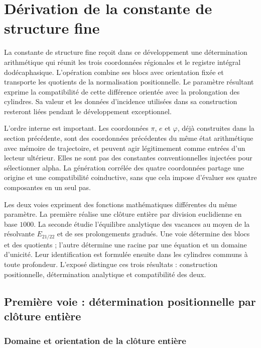 \section{Dérivation de la constante de structure fine}
\label{x_reciprocidad:sec:alpha}

La constante de structure fine reçoit dans ce développement une détermination arithmétique qui réunit les trois coordonnées régionales et le registre intégral dodécaphasique. L'opération combine ses blocs avec orientation fixée et transporte les quotients de la normalisation positionnelle. Le paramètre résultant exprime la compatibilité de cette différence orientée avec la prolongation des cylindres. Sa valeur et les données d'incidence utilisées dans sa construction resteront liées pendant le développement exceptionnel.

L'ordre interne est important. Les coordonnées \(\pi\), \(e\) et \(\varphi\), déjà construites dans la section précédente, sont des coordonnées
précédentes du même état arithmétique avec mémoire de trajectoire, et peuvent agir légitimement comme
entrées d'un lecteur ultérieur. Elles ne sont pas des constantes conventionnelles
injectées pour sélectionner alpha. La génération corrélée des quatre coordonnées partage une origine et
une compatibilité coinductive, sans que cela impose d'évaluer ses quatre
composantes en un seul pas.

Les deux voies expriment des fonctions mathématiques différentes du même paramètre.
La première réalise une clôture entière par division euclidienne en base
\(1000\). La seconde étudie l’équilibre analytique des vacances au moyen
de la résolvante \(E_{21/22}\) et de ses prolongements gradués. Une voie
détermine des blocs et des quotients ; l’autre détermine une racine par une
équation et un domaine d’unicité. Leur identification est formulée ensuite
dans les cylindres communs à toute profondeur. L’exposé distingue
ces trois résultats : construction positionnelle, détermination analytique
et compatibilité des deux.

\subsection{Première voie : détermination positionnelle par clôture entière}
\subsubsection{Domaine et orientation de la clôture entière}
\label{x_reciprocidad:subsec:alpha-dominio}

